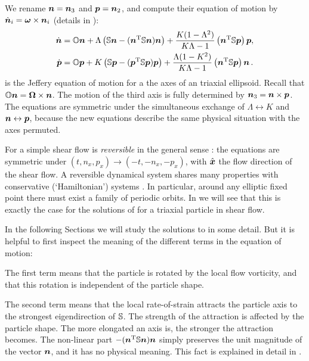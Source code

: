 \documentclass[thesis.tex]{subfiles}
\begin{document}
We rename $\mbox{\boldmath$n$} = \mbox{\boldmath$n$}_3$ and $\mbox{\boldmath$p$}=\mbox{\boldmath$n$}_2$, and compute their equation of motion by $\dot{\mbox{\boldmath$n$}}_i=\mbox{\boldmath$\omega$} \times \mbox{\boldmath$n$}_i$ (details in ):
\begin{align}
	\dot{\ve n}	&= \ma O \ve n 
	+ \Lambda\left(
	\ma S \ve n - (\ve n \transpose \ma S \ve n) \ve n
	\right)
    + \frac{K(1- \Lambda^2)}{K \Lambda - 1}\left(\ve n\transpose \ma S\ve p\right)\ve p,  \nn\\
\dot{\ve p}	&=    \ma O \ve p
	 + K\left(
\ma S \ve p  - (\ve p \transpose \ma S \ve p) \ve p
	 \right)
	  + \frac{\Lambda(1-K^2)}{K \Lambda - 1}\left(\ve n\transpose \ma S\ve p\right)\ve n\,. \eqnlab{np}
\end{align}
 is the Jeffery equation of motion for a the axes of an triaxial ellipsoid. Recall that $\mathbb{O} \mbox{\boldmath$n$}=\mbox{\boldmath$\Omega$} \times \mbox{\boldmath$n$}$. The motion of the third axis is fully determined by $\mbox{\boldmath$n$}_3 = \mbox{\boldmath$n$} \times \mbox{\boldmath$p$}$. The equations are symmetric under the simultaneous exchange of $\Lambda\leftrightarrow K$ and $\mbox{\boldmath$n$}\leftrightarrow\mbox{\boldmath$p$}$, because the new equations describe the same physical situation with the axes permuted.

For a simple shear flow  is \emph{reversible} in the general sense \cite{lamb1998}: the equations are symmetric under $(t,n_x,p_x)\to(-t, -n_x, -p_x)$, with $\hat{\mbox{\boldmath$x$}}$ the flow direction of the shear flow. A reversible dynamical system shares many properties with conservative (\lq Hamiltonian\rq) systems \cite{lamb1998}. In particular, around any elliptic fixed point there must exist a family of periodic orbits. In  we will see that this is exactly the case for the solutions of  for a triaxial particle in shear flow.

In the following Sections we will study the solutions to  in some detail. But it is helpful to first inspect the meaning of the different terms in the equation of motion:

The first term means that the particle is rotated by the local flow vorticity, and that this rotation is independent of the particle shape.

The second term means that the local rate-of-strain attracts the particle axis to the strongest eigendirection of $\mathbb{S}$. The strength of the attraction is affected by the particle shape. The more elongated an axis is, the stronger the attraction becomes. The non-linear part $- (\mbox{\boldmath$n$} ^{\mathrm T} \mathbb{S} \mbox{\boldmath$n$}) \mbox{\boldmath$n$}$ simply preserves the unit magnitude of the vector $\mbox{\boldmath$n$}$, and it has no physical meaning. This fact is explained in detail in . 
\end{document}
